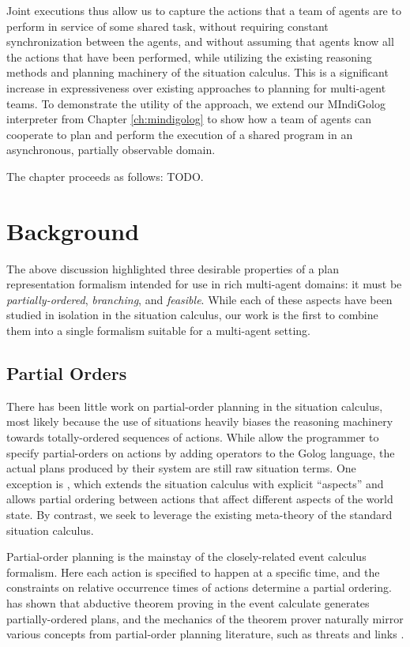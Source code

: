 Joint executions thus allow us to capture the actions that a team
of agents are to perform in service of some shared task, without requiring
constant synchronization between the agents, and without assuming
that agents know all the actions that have been performed, while utilizing
the existing reasoning methods and planning machinery of the situation
calculus. This is a significant increase in expressiveness over existing
approaches to planning for multi-agent teams. To demonstrate the utility
of the approach, we extend our MIndiGolog interpreter from Chapter
\ref{ch:mindigolog} to show how a team of agents can cooperate to
plan and perform the execution of a shared program in an asynchronous,
partially observable domain.

The chapter proceeds as follows: TODO.


\section{Background\label{sec:JointExec:Background}}

The above discussion highlighted three desirable properties of a plan
representation formalism intended for use in rich multi-agent domains:
it must be \emph{partially-ordered}, \emph{branching}, and \emph{feasible}.
While each of these aspects have been studied in isolation in the
situation calculus, our work is the first to combine them into a single
formalism suitable for a multi-agent setting.


\subsection{Partial Orders}

There has been little work on partial-order planning in the situation
calculus, most likely because the use of situations heavily biases
the reasoning machinery towards totally-ordered sequences of actions.
While \citet{son00htn_golog} allow the programmer to specify partial-orders
on actions by adding operators to the Golog language, the actual plans
produced by their system are still raw situation terms. One exception
is \citep{plaisted97sc_aspect}, which extends the situation calculus
with explicit {}``aspects'' and allows partial ordering between
actions that affect different aspects of the world state. By contrast,
we seek to leverage the existing meta-theory of the standard situation
calculus.

Partial-order planning is the mainstay of the closely-related event
calculus formalism. Here each action is specified to happen at a specific
time, and the constraints on relative occurrence times of actions
determine a partial ordering. \citet{Shanahan97ec_planning} has shown
that abductive theorem proving in the event calculate generates partially-ordered
plans, and the mechanics of the theorem prover naturally mirror various
concepts from partial-order planning literature, such as threats and
links \citep{peot92conditional_nonlinear}.

